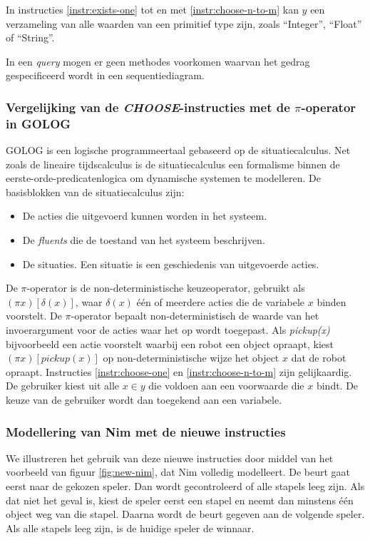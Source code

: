In instructies \ref{instr:exists-one} tot en met \ref{instr:choose-n-to-m} kan $y$ een verzameling van alle waarden van een primitief type zijn, zoals ``Integer'', ``Float'' of ``String''.

In een \textit{query} mogen er geen methodes voorkomen waarvan het gedrag gespecificeerd wordt in een sequentiediagram.

\subsubsection{Vergelijking van de \textit{CHOOSE}-instructies met de $\pi$-operator in GOLOG}

GOLOG\cite{levesque1997golog} is een logische programmeertaal gebaseerd op de situatiecalculus. Net zoals de lineaire tijdscalculus is de situatiecalculus een formalisme binnen de eerste-orde-predicatenlogica om dynamische systemen te modelleren. De basisblokken van de situatiecalculus zijn:

\begin{itemize}
	\item De acties die uitgevoerd kunnen worden in het systeem.
	\item De \textit{fluents} die de toestand van het systeem beschrijven.
	\item De situaties. Een situatie is een geschiedenis van uitgevoerde acties.
\end{itemize}

De $\pi$-operator is de non-deterministische keuzeoperator, gebruikt als $(\pi{}x)[\delta{}(x)]$, waar $\delta{}(x)$ \'e\'en of meerdere acties die de variabele $x$ binden voorstelt. De $\pi$-operator bepaalt non-deterministisch de waarde van het invoerargument voor de acties waar het op wordt toegepast. Als \textit{pickup(x)} bijvoorbeeld een actie voorstelt waarbij een robot een object opraapt, kiest $(\pi{}x)[pickup(x)]$ op non-deterministische wijze het object $x$ dat de robot opraapt. Instructies \ref{instr:choose-one} en \ref{instr:choose-n-to-m} zijn gelijkaardig. De gebruiker kiest uit alle $x \in y$ die voldoen aan een voorwaarde die $x$ bindt. De keuze van de gebruiker wordt dan toegekend aan een variabele. 

\subsubsection{Modellering van Nim met de nieuwe instructies}

We illustreren het gebruik van deze nieuwe instructies door middel van het voorbeeld van figuur \ref{fig:new-nim}, dat Nim volledig modelleert. De beurt gaat eerst naar de gekozen speler. Dan wordt gecontroleerd of alle stapels leeg zijn. Als dat niet het geval is, kiest de speler eerst een stapel en neemt dan minstens \'e\'en object weg van die stapel. Daarna wordt de beurt gegeven aan de volgende speler. Als alle stapels leeg zijn, is de huidige speler de winnaar.

